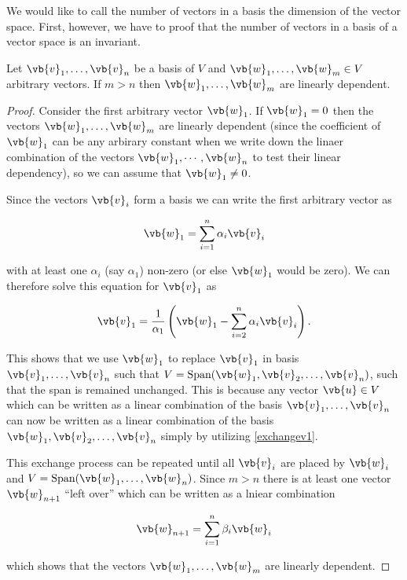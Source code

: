 \documentclass[a4paper,12pt]{report}
\begin{document}
We would like to call the number of vectors in a basis the dimension of the vector space. First, however, we have to proof that the number of vectors in a basis of a vector space is an invariant.

\begin{lemma} \label{exchangelemma} 
Let \(\vb{v} _{1}, \ldots , \vb{v} _{n}  \) be a basis of \(V\) and \(\vb{w} _{1}, \ldots ,\vb{w} _{m} \in V \) arbitrary vectors. If \(m > n\) then \(\vb{w} _{1}, \ldots ,\vb{w} _{m}  \) are linearly dependent.  
\end{lemma}

\begin{proof}
Consider the first arbitrary vector \(\vb{w} _{1} \). If \(\vb{w} _{1} = 0 \) then the vectors \(\vb{w} _{1}, \ldots ,\vb{w} _{m}  \) are linearly dependent (since the coefficient of \(\vb{w} _{1} \) can be any arbirary constant when we write down the linaer combination of the vectors \(\vb{w}_1, \cdots, \vb{w}_n \) to test their linear dependency), so we can assume that \(\vb{w} _{1} \neq 0 \).    

Since the vectors \(\vb{v} _{i} \) form a basis we can write the first arbitrary vector as

\begin{equation}
    \vb{w} _{1} = \sum_{i=1}^{n} \alpha _{i} \vb{v} _{i}   
\end{equation}

with at least one \(\alpha _{i}\)  (say \(\alpha _{1} \)) non-zero (or else \(\vb{w} _{1} \) would be zero). We can therefore solve this equation for \(\vb{v} _{1} \) as

\begin{equation}
    \vb{v} _{1} = \frac{1}{\alpha _{1} } \left( \vb{w} _{1} - \sum_{i=2}^{n} \alpha _{i} \vb{v} _{i}   \right). \label{exchangev1} 
\end{equation}

This shows that we use \(\vb{w} _{1} \) to replace \(\vb{v} _{1} \) in basis \(\vb{v}_{1}, \ldots, \vb{v}_n \) such that \(V = \text{Span}(\vb{w} _{1}, \vb{v}_{2}, \ldots, \vb{v}_n  ) \), such that the span is remained unchanged. This is because any vector \(\vb{u} \in V\) which can be written as a linear combination of the basis \(\vb{v}_{1}, \ldots, \vb{v}_n \) can now be written as a linear combination of the basis \(\vb{w} _{1}, \vb{v}_{2}, \ldots, \vb{v}_n \) simply by utilizing \cref{exchangev1}.     

This exchange process can be repeated until all \(\vb{v} _{i} \) are placed by \(\vb{w} _{i} \) and \(V = \text{Span} (\vb{w}_{1}, \ldots, \vb{w}_n ) \). Since \(m > n\) there is at least one vector \(\vb{w} _{n+1} \) ``left over'' which can be written as a lniear combination 

\begin{equation}
    \vb{w} _{n+1} = \sum_{i=1}^{n} \beta _{i} \vb{w} _{i}  
\end{equation}

which shows that the vectors \(\vb{w}_{1}, \ldots, \vb{w}_m\) are linearly dependent.
\end{proof}
\end{document}
